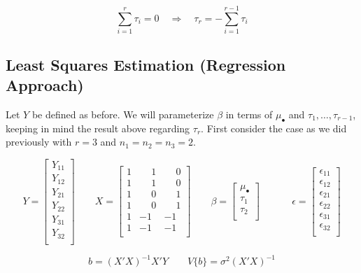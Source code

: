 \documentclass[
]{book}
\begin{document}
\[
\sum_{i=1}^{r}\tau_i=0 \quad \Rightarrow \quad \tau_r = -\sum_{i=1}^{r-1}\tau_i
\]

\subsection{Least Squares Estimation (Regression
Approach)}\label{least-squares-estimation-regression-approach}

Let \(Y\) be defined as before. We will parameterize \(\beta\) in terms
of \(\mu_{\bullet}\) and \(\tau_1,\ldots,\tau_{r-1}\), keeping in mind
the result above regarding \(\tau_r\). First consider the case as we did
previously with \(r=3\) and \(n_1=n_2=n_3=2\).

\[ 
Y = \begin{bmatrix}
Y_{11} \\ Y_{12} \\ Y_{21} \\ Y_{22} \\
Y_{31} \\ Y_{32} \\ \end{bmatrix}
\qquad 
X = \begin{bmatrix}
1 & \phantom{-}1 & \phantom{-}0 \\ 1 & \phantom{-}1 & \phantom{-}0 \\
1 & \phantom{-}0 & \phantom{-}1 \\ 1 & \phantom{-}0 & \phantom{-}1 \\
1 & -1 & -1 \\ 1 & -1 & -1 \\ \end{bmatrix}
\qquad
\beta = \begin{bmatrix}
\mu_{\bullet} \\ \tau_1 \\ \tau_2 \\ \end{bmatrix}\phantom{-}
\qquad 
\epsilon = \begin{bmatrix}
\epsilon_{11} \\ \epsilon_{12} \\ \epsilon_{21} \\ \epsilon_{22} \\
\epsilon_{31} \\ \epsilon_{32} \\ \end{bmatrix}
\]

\[ b = \left(X'X\right)^{-1}X'Y \qquad V\{b\} = 
\sigma^2\left(X'X\right)^{-1} \]
\end{document}
